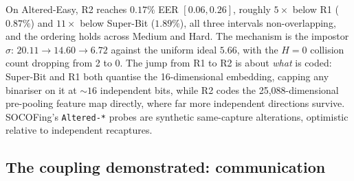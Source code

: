 \begin{table}[htbp]
\centering
\caption{EER with 95\% identity-bootstrap intervals on held-out SOCOFing, plus impostor $\sigma$,
effective bits $m_{\mathrm{eff}}$ (Eq.~\ref{eq:meff}), and $H{=}0$ impostor collisions out of the
${\approx}1.44$M probe$\times$gallery pairs. Super-Bit Medium/Hard are from a separate run
(\texttt{12\_code\_analysis.py}) than the R1/R2 ladder (\texttt{29\_qat\_ladder.py}); both share the
corpus and split.}
\label{tab:acc}
\end{table}

On Altered-Easy, R2 reaches $0.17\%$ EER $[0.06,0.26]$, roughly $5\times$ below R1 ($0.87\%$) and
$11\times$ below Super-Bit ($1.89\%$), all three intervals non-overlapping, and the ordering holds
across Medium and Hard. The mechanism is the impostor $\sigma$: $20.11 \to 14.60 \to 6.72$ against the
uniform ideal $5.66$, with the $H{=}0$ collision count dropping from 2 to 0. The jump from R1 to R2 is
about \emph{what} is coded: Super-Bit and R1 both quantise the 16-dimensional embedding, capping any
binariser on it at ${\sim}16$ independent bits, while R2 codes the 25,088-dimensional pre-pooling
feature map directly, where far more independent directions survive. SOCOFing's \texttt{Altered-*}
probes are synthetic same-capture alterations, optimistic relative to independent recaptures.

\subsection{The coupling demonstrated: communication}
\label{sec:eval-comms}

